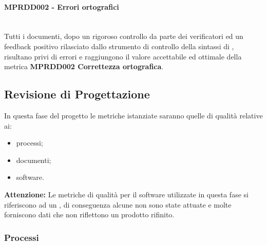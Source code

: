 \paragraph{MPRDD002 - Errori ortografici}\mbox{}\\[0.4cm]
Tutti i documenti, dopo un rigoroso controllo da parte dei verificatori ed un feedback positivo rilasciato dallo strumento di controllo della sintassi di , risultano privi di errori e raggiungono il valore accettabile ed ottimale della metrica  \textbf{MPRDD002 Correttezza ortografica}.

\clearpage
\subsection{Revisione di Progettazione}
\label{sec:revisione_progettazione}
In questa fase del progetto le metriche istanziate saranno quelle di qualità relative ai:
\begin{itemize}
	\item processi;
	\item documenti;
	\item software.
\end{itemize}
\textbf{Attenzione:} Le metriche di qualità per il software utilizzate in questa fase si riferiscono ad un , di conseguenza alcune non sono state attuate e molte forniscono dati che non riflettono un prodotto rifinito.
\subsubsection{Processi}
